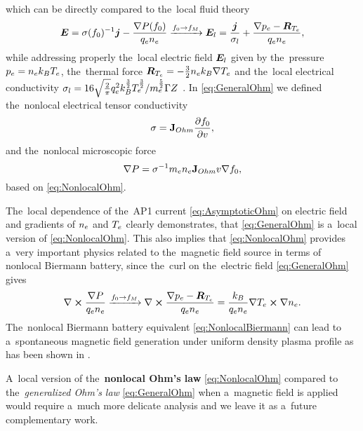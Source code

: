 which can be directly compared to the~local fluid theory 
\begin{equation}
  \boldsymbol{E} = \mathbf{\sigma}(f_0)^{-1} \boldsymbol{j} 
  - \frac{\nabla P (f_0)}{q_e n_e}
  \xrightarrow{f_0 \rightarrow f_M}
  \boldsymbol{E}_{l} = \frac{\boldsymbol{j}}{\sigma_{l}}
  + \frac{\nabla p_e - \boldsymbol{R}_{T_e}}{q_e n_e} 
  ,
  \label{eq:GeneralOhm} 
\end{equation}
while addressing properly the~local electric field $\boldsymbol{E}_{l}$ given by
the~pressure $p_e = n_e k_B T_e$,
the~thermal force $\boldsymbol{R}_{T_e} = - \frac{3}{2} n_e k_B \nabla T_e$ 
and the~local electrical conductivity 
$\sigma_{l} = 16\sqrt{\frac{2}{\pi}}q_e^2 k_B^\frac{3}{2} T_e^\frac{3}{2}
/ m_e^\frac{5}{2} \Gamma Z$ \cite{Braginskii_1965_3}.
In \eqref{eq:GeneralOhm} we defined the~nonlocal electrical tensor conductivity 
\begin{equation}
  \mathbf{\sigma} = \mathbf{J}_{Ohm}\frac{\partial{f_0}}{\partial{v}}
  ,
  \label{eq:NonlocalSigma}
\end{equation}
and the~nonlocal microscopic force
\begin{equation}
  \nabla P = \mathbf{\sigma}^{-1}m_en_e \mathbf{J}_{Ohm}v \nabla f_0
  ,
  \label{eq:NonlocalGradP}
\end{equation}
based on \eqref{eq:NonlocalOhm}.

The~local dependence of the~AP1 current \eqref{eq:AsymptoticOhm} 
on electric field and gradients of $n_e$ and $T_e$ clearly demonstrates, 
that \eqref{eq:GeneralOhm} is a~local version of \eqref{eq:NonlocalOhm}.
This also implies that \eqref{eq:NonlocalOhm} provides a~very important 
physics related to the~magnetic field source in terms of nonlocal 
Biermann battery,
since the~curl on the~electric field 
\eqref{eq:GeneralOhm} gives
\begin{equation}
  \nabla\boldsymbol{\times} \frac{\nabla P}{q_e n_e} 
  \xrightarrow{f_0 \rightarrow f_M} 
  \nabla\boldsymbol{\times} \frac{\nabla p_e - \boldsymbol{R}_{T_e}}{q_e n_e} =
  \frac{k_B}{q_en_e}\nabla T_e \boldsymbol{\times}\nabla n_e
  .
  \label{eq:NonlocalBiermann}
\end{equation}
The~nonlocal Biermann battery equivalent \eqref{eq:NonlocalBiermann} 
can lead to a~spontaneous magnetic field generation under uniform 
density plasma profile as has been shown in \cite{Kingham_PRL2002}.

A~local version of the~{\bf nonlocal Ohm's law} \eqref{eq:NonlocalOhm} 
compared to the~\textit{generalized Ohm's law} \eqref{eq:GeneralOhm} when
a~magnetic field is applied would require a~much more delicate analysis and 
we leave it as a~future complementary work.


